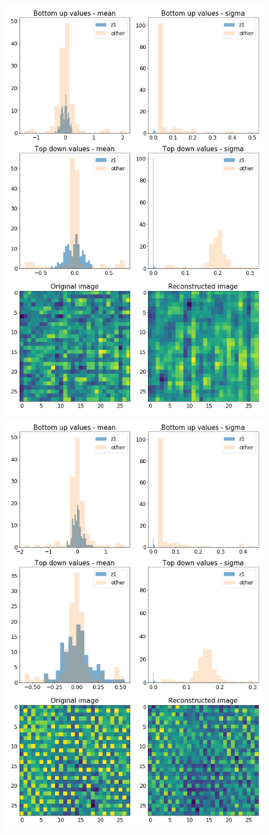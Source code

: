\documentclass[12pt, english]{article}
\begin{document}
\begin{figure}[H]
  \begin{minipage}{0.5\linewidth}
    \centering
    \includegraphics[width=.65\linewidth]{z1_vis/14_DenseLinLinLadderVAE_noContrastNorm_-stats-1_TD_BU_COMPS_1.png}
  \end{minipage}
  \begin{minipage}{0.5\linewidth}
    \centering
    \includegraphics[width=.65\linewidth]{z1_vis/14_DenseLinLinLadderVAE_noContrastNorm_-stats-2_TD_BU_COMPS_1.png} 
  \end{minipage}


\end{figure}
\end{document}
